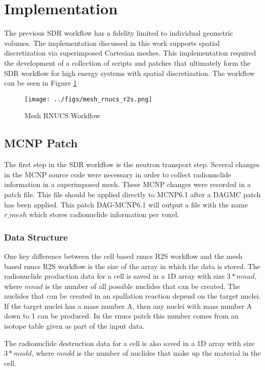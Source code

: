 \section{Implementation}
The previous SDR workflow has a fidelity limited to individual
geometric volumes. The implementation discussed in this work
supports spatial discretization via superimposed Cartesian meshes. 
This implementation required the 
development of a collection of scripts and patches that 
ultimately form the SDR workflow for high energy systems 
with spatial discretization. The workflow can be seen in Figure
\ref{mesh_rnucs}

\begin{figure}[ht]
\begin{centering}
\texttt{[image: ../figs/mesh\_rnucs\_r2s.png]}
\caption{Mesh RNUCS Workflow}
\label{mesh_rnucs}
\end{centering}
\end{figure}


\subsection{MCNP Patch}
The first step in the SDR  workflow is the neutron transport step.
Several changes in the MCNP source code were necessary in order to 
collect radionuclide information in a superimposed mesh.
These MCNP changes were recorded in a patch file. This file should be applied 
directly to MCNP6.1 after a DAGMC patch has been applied.
This patch DAG-MCNP6.1 will output a file with the name $r\_mesh$ which stores 
radionuclide information per voxel.
\subsubsection{Data Structure}
One key difference between the cell based rnucs R2S workflow and the mesh based
rnucs R2S workflow is the size of the array in which the data is stored.
The radionuclide production data for a cell is saved in a 1D array with
size $3*mnad$, where $mnad$ is the number of all possible nuclides
that can be created.
The nuclides that can be created in an spallation reaction
depend on the target nuclei. If the target nuclei has a mass
number A, then any nuclei with mass number A down to 1 can be
produced. In the rnucs patch this number comes from an isotope table
given as part of the input data. 

The radionuclide destruction data for a cell is also saved in a 1D array
with size $3*mndd$, where $mndd$ is the number of nuclides that make up
the material in the cell. 

